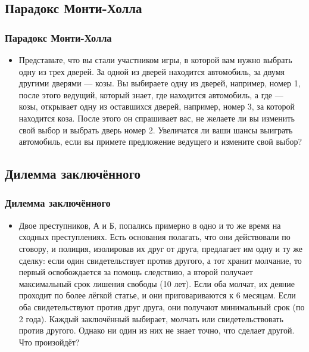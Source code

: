 \documentclass[compress,red]{beamer}
\begin{document}
\subsection{Парадокс Монти-Холла}
\begin{frame}[fragile]
  \frametitle{Парадокс Монти-Холла}
  \begin{itemize}
    \item Представьте, что вы стали участником игры, в которой вам нужно выбрать одну из трех дверей. За одной из дверей находится автомобиль, за двумя другими дверями --- козы. Вы выбираете одну из дверей, например, номер 1, после этого ведущий, который знает, где находится автомобиль, а где --- козы, открывает одну из оставшихся дверей, например, номер 3, за которой находится коза. После этого он спрашивает вас, не желаете ли вы изменить свой выбор и выбрать дверь номер 2. Увеличатся ли ваши шансы выиграть автомобиль, если вы примете предложение ведущего и измените свой выбор?
  \end{itemize}
\end{frame}

\subsection{Дилемма заключённого}
\begin{frame}[fragile]
  \frametitle{Дилемма заключённого}
  \begin{itemize}
    \item Двое преступников, А и Б, попались примерно в одно и то же время на сходных преступлениях. Есть основания полагать, что они действовали по сговору, и полиция, изолировав их друг от друга, предлагает им одну и ту же сделку: если один свидетельствует против другого, а тот хранит молчание, то первый освобождается за помощь следствию, а второй получает максимальный срок лишения свободы (10 лет). Если оба молчат, их деяние проходит по более лёгкой статье, и они приговариваются к 6 месяцам. Если оба свидетельствуют против друг друга, они получают минимальный срок (по 2 года). Каждый заключённый выбирает, молчать или свидетельствовать против другого. Однако ни один из них не знает точно, что сделает другой. Что произойдёт?
  \end{itemize}
\end{frame}
\end{document}
